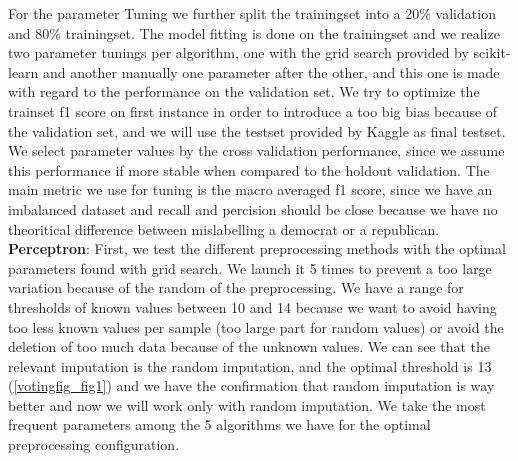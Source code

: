 \documentclass[11pt]{article}
\begin{document}
For the parameter Tuning we further split the trainingset into a $20\%$ validation and $80\%$ trainingset. The model fitting is done on the trainingset and we realize two parameter tunings per algorithm, one with the grid search provided by scikit-learn and another manually one parameter after the other, and this one is made with regard to the performance on the validation set. We try to optimize the trainset f1 score on first instance in order to introduce a too big bias because of the validation set, and we will use the testset provided by Kaggle as final testset. We select parameter values by the cross validation performance, since we assume this performance if more stable when compared to the holdout validation. The main metric we use for tuning is the macro averaged f1 score, since we have an imbalanced dataset and recall and percision should be close because we have no theoritical difference between mislabelling a democrat or a republican.
%
\newline
\textbf{Perceptron}: First, we test the different preprocessing methods with the optimal parameters found with grid search. We launch it 5 times to prevent a too large variation because of the random of the preprocessing. We have a range for thresholds of known values between 10 and 14 because we want to avoid having too less known values per sample (too large part for random values) or avoid the deletion of too much data because of the unknown values.
We can see that the relevant imputation is the random imputation, and the optimal threshold is 13 (\ref{votingfig_fig1}) and we have the confirmation that random imputation is way better and now we will work only with random imputation. We take the most frequent parameters among the 5 algorithms we have for the optimal preprocessing configuration.
\end{document}
